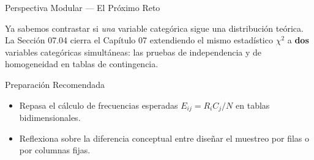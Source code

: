 \documentclass[10pt, aspectratio=169]{beamer}
\begin{document}
\begin{frame}{Perspectiva Modular --- El Próximo Reto}
  \scriptsize
  \begin{retoclase}
    Ya sabemos contrastar si \emph{una} variable categórica sigue una distribución teórica. La Sección 07.04 cierra el Capítulo 07 extendiendo el mismo estadístico $\chi^2$ a \textbf{dos} variables categóricas simultáneas: las pruebas de independencia y de homogeneidad en tablas de contingencia.
  \end{retoclase}

  \vspace{0.08cm}
  \pause
  \begin{alertblock}{Preparación Recomendada}
    \begin{itemize}\itemsep=0.06cm
      \item Repasa el cálculo de frecuencias esperadas $E_{ij}=R_iC_j/N$ en tablas bidimensionales.
      \item Reflexiona sobre la diferencia conceptual entre diseñar el muestreo por filas o por columnas fijas.
    \end{itemize}
  \end{alertblock}
\end{frame}
\end{document}

